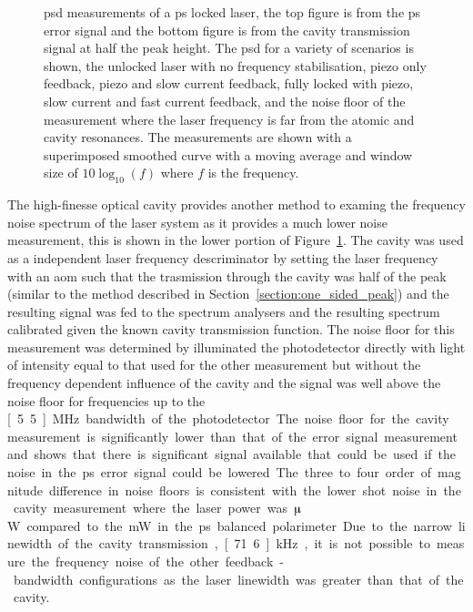 \begin{figure}
\center

\caption{\Gls{psd} measurements of a \gls{ps} locked laser, the top figure is from the \gls{ps} error signal and the bottom figure is from the cavity transmission signal at half the peak height.
The \gls{psd} for a variety of scenarios is shown, the unlocked laser with no frequency stabilisation, piezo only feedback, piezo and slow current feedback, fully locked with piezo, slow current and fast current feedback, and the noise floor of the measurement where the laser frequency is far from the atomic and cavity resonances.
The measurements are shown with a superimposed smoothed curve with a moving average and window size of $10\log_{10}(f)$ where $f$ is the frequency.}
\label{figure:psd}
\end{figure}

The high-finesse optical cavity provides another method to examing the frequency noise spectrum of the laser system as it provides a much lower noise measurement, this is shown in the lower portion of Figure~\ref{figure:psd}.
The cavity was used as a independent laser frequency descriminator by setting the laser frequency with an \gls{aom} such that the trasmission through the cavity was half of the peak (similar to the method described in Section~\ref{section:one_sided_peak}) and the resulting signal was fed to the spectrum analysers and the resulting spectrum calibrated given the known cavity transmission function.
The noise floor for this measurement was determined by illuminated the photodetector directly with light of intensity equal to that used for the other measurement but without the frequency dependent influence of the cavity and the signal was well above the noise floor for frequencies up to the \unit[5.5]{MHz} bandwidth of the photodetector.
The noise floor for the cavity measurement is significantly lower than that of the error signal measurement and shows that there is significant signal available that could be used if the noise in the \gls{ps} error signal could be lowered.
The three to four order of magnitude difference in noise floors is consistent with the lower shot noise in the cavity measurement where the laser power was \unit[10]{$\muup$W} compared to the \unit[1]{mW} in the \gls{ps} balanced polarimeter.
Due to the narrow linewidth of the cavity transmission, \unit[71.6]{kHz}, it is not possible to measure the frequency noise of the other feedback-bandwidth configurations as the laser linewidth was greater than that of the cavity.


